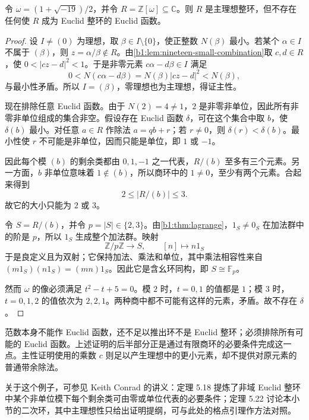 \begin{proposition}\label{b1:prop:noneuclidean-pid}
	令 \(\omega=(1+\sqrt{-19})/2\)，并令 \(R=\mathbb Z[\omega]\subseteq\mathbb C\)。则 \(R\) 是主理想整环，但不存在任何使 \(R\) 成为 Euclid 整环的 Euclid 函数。
\end{proposition}
\begin{proof}
	设 \(I\ne(0)\) 为理想，取 \(\beta\in I\setminus\{0\}\)，使正整数 \(N(\beta)\) 最小。若某个 \(\alpha\in I\) 不属于 \((\beta)\)，则 \(z=\alpha/\beta\notin R\)。由\cref{b1:lem:nineteen-small-combination}取 \(c,d\in R\)，使 \(0<\lvert cz-d\rvert^2<1\)。于是非零元素 \(c\alpha-d\beta\in I\) 满足
	\[
		0<N(c\alpha-d\beta) =N(\beta)\lvert cz-d\rvert^2<N(\beta),
	\]
	与最小性矛盾。所以 \(I=(\beta)\)，零理想也为主理想，得证主性。

	现在排除任意 Euclid 函数。由于 \(N(2)=4\ne1\)，\(2\) 是非零非单位，因此所有非零非单位组成的集合非空。假设存在 Euclid 函数 \(\delta\)，可在这个集合中取 \(b\)，使 \(\delta(b)\) 最小。对任意 \(a\in R\) 作除法 \(a=qb+r\)；若 \(r\ne0\)，则 \(\delta(r)<\delta(b)\)。最小性使 \(r\) 不可能是非单位，因而只能是单位，即 \(1\) 或 \(-1\)。

	因此每个模 \((b)\) 的剩余类都由 \(0,1,-1\) 之一代表，\(R/(b)\) 至多有三个元素。另一方面，\(b\) 非单位意味着 \(1\notin(b)\)，所以商环中的 \(1\ne0\)，至少有两个元素。合起来得到
	\[
		2\leq\lvert R/(b)\rvert\leq3.
	\]
	故它的大小只能为 \(2\) 或 \(3\)。

	令 \(S=R/(b)\)，并令 \(p=\lvert S\rvert\in\{2,3\}\)。由\cref{b1:thm:lagrange}，\(1_S\ne0_S\) 在加法群中的阶是 \(p\)，所以 \(1_S\) 生成整个加法群。映射
	\[
		\mathbb Z/p\mathbb Z\longrightarrow S,\qquad [n]\longmapsto n1_S
	\]
	于是良定义且为双射；它保持加法、乘法和单位，其中乘法相容性来自 \((m1_S)(n1_S)=(mn)1_S\)。因此它是含幺环同构，即 \(S\cong\mathbb F_p\)。

	然而 \(\omega\) 的像必须满足 \(t^2-t+5=0\)。模 \(2\) 时，\(t=0,1\) 的值都是 \(1\)；模 \(3\) 时，\(t=0,1,2\) 的值依次为 \(2,2,1\)。两种商中都不可能有这样的元素，矛盾。故不存在 \(\delta\)。
\end{proof}

范数本身不能作 Euclid 函数，还不足以推出环不是 Euclid 整环；必须排除所有可能的 Euclid 函数。上述证明的后半部分正是通过有限商环的必要条件完成这一点。主性证明使用的乘数 \(c\) 则足以产生理想中的更小元素，却不提供对原元素的普通带余除法。

\ProseParagraphBreak
关于这个例子，可参见 Keith Conrad 的讲义\cite[Theorems 5.18, 5.22]{ConradRemarksEuclideanDomains}：定理 5.18 提炼了非域 Euclid 整环中某个非单位模下每个剩余类可由零或单位代表的必要条件；定理 5.22 讨论本小节的二次环，其中主理想性只给出证明提纲，可与此处的格点引理作方法对照。
